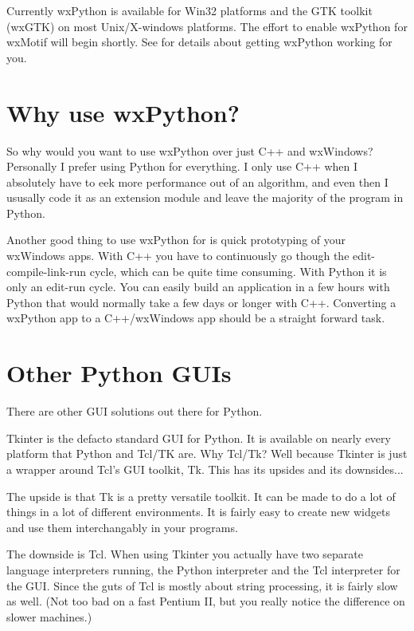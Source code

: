 Currently wxPython is available for Win32 platforms and the GTK
toolkit (wxGTK) on most Unix/X-windows platforms. The effort to
enable wxPython for wxMotif will begin shortly. See  for
details about getting wxPython working for you.

\section{Why use wxPython?}\label{wxpwhy}

So why would you want to use wxPython over just C++ and wxWindows?
Personally I prefer using Python for everything. I only use C++ when
I absolutely have to eek more performance out of an algorithm, and even
then I ususally code it as an extension module and leave the majority
of the program in Python.

Another good thing to use wxPython for is quick prototyping of your
wxWindows apps. With C++ you have to continuously go though the
edit-compile-link-run cycle, which can be quite time consuming. With
Python it is only an edit-run cycle. You can easily build an
application in a few hours with Python that would normally take a few
days or longer with C++. Converting a wxPython app to a C++/wxWindows app
should be a straight forward task.

\section{Other Python GUIs}\label{wxpother}

There are other GUI solutions out there for Python.


Tkinter is the defacto standard GUI for Python. It is available
on nearly every platform that Python and Tcl/TK are. Why Tcl/Tk?
Well because Tkinter is just a wrapper around Tcl's GUI toolkit, Tk.
This has its upsides and its downsides...

The upside is that Tk is a pretty versatile toolkit. It can be made
to do a lot of things in a lot of different environments. It is fairly
easy to create new widgets and use them interchangably in your
programs.

The downside is Tcl. When using Tkinter you actually have two
separate language interpreters running, the Python interpreter and the
Tcl interpreter for the GUI. Since the guts of Tcl is mostly about
string processing, it is fairly slow as well. (Not too bad on a fast
Pentium II, but you really notice the difference on slower machines.)

